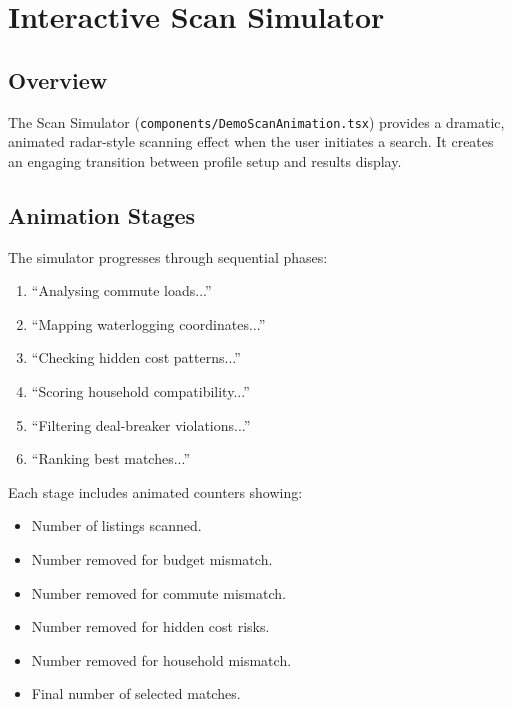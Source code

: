 \documentclass[12pt, a4paper, oneside]{report}
\newcommand{\filepath}[1]{\texttt{\small\color{codeblue}#1}}
\begin{document}
\chapter{Interactive Scan Simulator}

\section{Overview}

The Scan Simulator (\filepath{components/DemoScanAnimation.tsx}) provides a dramatic, animated radar-style scanning effect when the user initiates a search. It creates an engaging transition between profile setup and results display.

\section{Animation Stages}

The simulator progresses through sequential phases:

\begin{enumerate}[leftmargin=2em]
  \item ``Analysing commute loads...''
  \item ``Mapping waterlogging coordinates...''
  \item ``Checking hidden cost patterns...''
  \item ``Scoring household compatibility...''
  \item ``Filtering deal-breaker violations...''
  \item ``Ranking best matches...''
\end{enumerate}

Each stage includes animated counters showing:
\begin{itemize}[leftmargin=2em]
  \item Number of listings scanned.
  \item Number removed for budget mismatch.
  \item Number removed for commute mismatch.
  \item Number removed for hidden cost risks.
  \item Number removed for household mismatch.
  \item Final number of selected matches.
\end{itemize}
\end{document}
